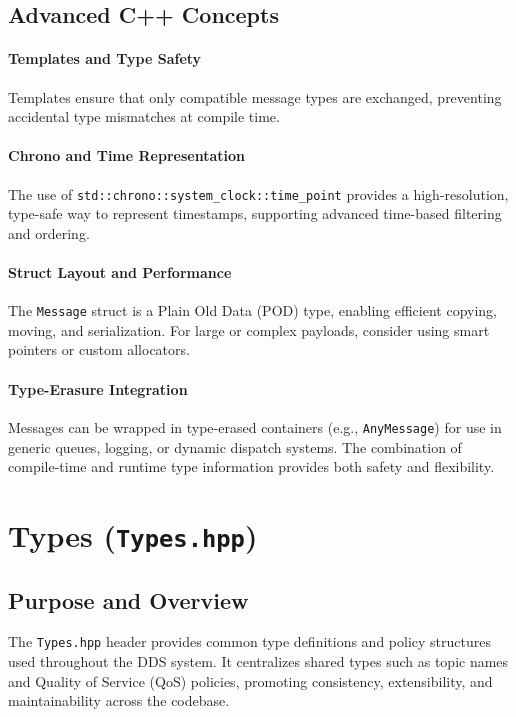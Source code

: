\documentclass[12pt]{report}
\begin{document}
\subsection{Advanced C++ Concepts}
\paragraph{Templates and Type Safety}
Templates ensure that only compatible message types are exchanged, preventing accidental type mismatches at compile time.

\paragraph{Chrono and Time Representation}
The use of \texttt{std::chrono::system\_clock::time\_point} provides a high-resolution, type-safe way to represent timestamps, supporting advanced time-based filtering and ordering.

\paragraph{Struct Layout and Performance}
The \texttt{Message} struct is a Plain Old Data (POD) type, enabling efficient copying, moving, and serialization. For large or complex payloads, consider using smart pointers or custom allocators.

\paragraph{Type-Erasure Integration}
Messages can be wrapped in type-erased containers (e.g., \texttt{AnyMessage}) for use in generic queues, logging, or dynamic dispatch systems. The combination of compile-time and runtime type information provides both safety and flexibility.

\section{Types (\texttt{Types.hpp})}

\subsection{Purpose and Overview}
The \texttt{Types.hpp} header provides common type definitions and policy structures used throughout the DDS system. It centralizes shared types such as topic names and Quality of Service (QoS) policies, promoting consistency, extensibility, and maintainability across the codebase.
\end{document}
